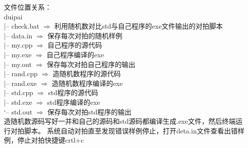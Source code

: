 文件位置关系：\\ 
duipai\\
|-- check.bat $\Longrightarrow$ 利用随机数对比std与自己程序的exe文件输出的对拍脚本\\
|-- data.in $\Longrightarrow$ 保存每次对拍的随机样例\\
|-- my.cpp $\Longrightarrow$ 自己程序的源代码\\
|-- my.exe $\Longrightarrow$ 自己程序编译的exe\\
|-- my.out $\Longrightarrow$ 保存每次对拍自己程序的输出\\
|-- rand.cpp $\Longrightarrow$ 造随机数程序的源代码\\
|-- rand.exe $\Longrightarrow$ 造随机数程序编译的exe\\
|-- std.cpp $\Longrightarrow$ std程序的源代码\\
|-- std.exe $\Longrightarrow$ std程序编译的exe\\
`-- std.out $\Longrightarrow$ 保存每次对拍std程序的输出\\
造随机数源码写好一并和自己的源码和std源码都编译生成.exe文件，然后终端运行对拍脚本。
系统自动对拍直至发现错误样例停止，打开deta.in文件查看出错样例，停止对拍快捷键crtl+c